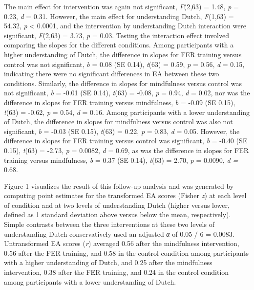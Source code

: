 \documentclass[authordate, empirical]{jote-new-article}
\begin{document}
	The main effect for intervention was again not significant, \emph{F}(2,63) = 1.48, \emph{p} = 0.23, \emph{d} = 0.31. However, the main effect for understanding Dutch, \emph{F}(1,63) = 54.32, \emph{p} < 0.0001, and the intervention by understanding Dutch interaction were significant, \emph{F}(2,63) = 3.73, \emph{p} = 0.03. Testing the interaction effect involved comparing the slopes for the different conditions. Among participants with a higher understanding of Dutch, the difference in slopes for FER training versus control was not significant, \emph{b} = 0.08 (SE 0.14), \emph{t}(63) = 0.59, \emph{p} = 0.56, \emph{d} = 0.15, indicating there were no significant differences in EA between these two conditions. Similarly, the difference in slopes for mindfulness versus control was not significant, \emph{b} = -0.01 (SE 0.14), \emph{t}(63) = -0.08, \emph{p} = 0.94, \emph{d} = 0.02, nor was the difference in slopes for FER training versus mindfulness, \emph{b} = -0.09 (SE 0.15), \emph{t}(63) = -0.62, \emph{p} = 0.54, \emph{d} = 0.16. Among participants with a lower understanding of Dutch, the difference in slopes for mindfulness versus control was also not significant, \emph{b} = -0.03 (SE 0.15), \emph{t}(63) = 0.22, \emph{p} = 0.83, \emph{d} = 0.05. However, the difference in slopes for FER training versus control was significant, \emph{b} = -0.40 (SE 0.15), \emph{t}(63) = -2.73, \emph{p} = 0.0082, \emph{d} = 0.69, as was the difference in slopes for FER training versus mindfulness, \emph{b} = 0.37 (SE 0.14), \emph{t}(63) = 2.70, \emph{p} = 0.0090, \emph{d = }0.68.



	Figure 1 visualizes the result of this follow-up analysis and was generated by computing point estimates for the transformed EA scores (Fisher \emph{z}) at each level of condition and at two levels of understanding Dutch (higher versus lower, defined as 1 standard deviation above versus below the mean, respectively). Simple contrasts between the three interventions at these two levels of understanding Dutch conservatively used an adjusted \emph{α} of 0.05 / 6 = 0.0083. Untransformed EA scores (\emph{r})\emph{ }averaged 0.56 after the mindfulness intervention, 0.56 after the FER training, and 0.58 in the control condition among participants with a higher understanding of Dutch, and 0.25 after the mindfulness intervention, 0.38 after the FER training, and 0.24 in the control condition among participants with a lower understanding of Dutch.
\end{document}
